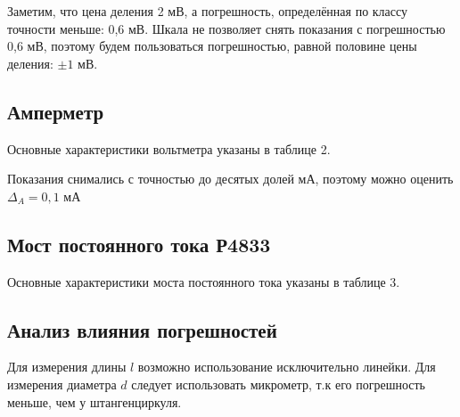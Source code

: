 \documentclass{report}
\begin{document}
	Заметим, что цена деления 2 мВ, а погрешность, определённая по классу точности меньше: 0,6 мВ. Шкала не позволяет снять показания с погрешностью 0,6 мВ, поэтому будем пользоваться погрешностью, равной половине цены деления: $\pm 1$ мВ.
	
	\subsection*{Амперметр}
		
	Основные характеристики вольтметра указаны в таблице 2.
	
	\begin{table}[!h]
		\centering
	\end{table}
	
	Показания снимались с точностью до десятых долей мА, поэтому можно оценить $\Delta_{A} = 0,1$ мА
	
	\subsection*{Мост постоянного тока Р4833}
	
	Основные характеристики моста постоянного тока указаны в таблице 3.
	
	\begin{table}[!h]
		\centering
	\end{table}
	
	\subsection*{Анализ влияния погрешностей}
	Для измерения длины $l$ возможно использование исключительно линейки. Для измерения диаметра $d$ следует использовать микрометр, т.к его погрешность меньше, чем у штангенциркуля.
	
\end{document}
